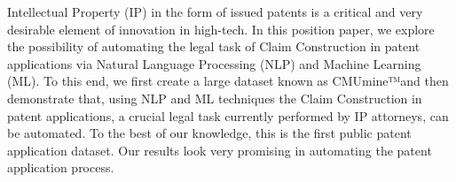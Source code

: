 Intellectual Property (IP) in the form of issued patents is a critical and very desirable element of innovation in high-tech. In this position paper, we explore the possibility of automating the legal task of Claim Construction in patent applications via Natural Language Processing (NLP) and Machine Learning (ML). To this end, we first create a large dataset known as CMUmine™and then demonstrate that, using NLP and ML techniques the Claim Construction in patent applications, a crucial legal task currently performed by IP attorneys, can be automated. To the best of our knowledge, this is the first public patent application dataset. Our results look very promising in automating the patent application process.
